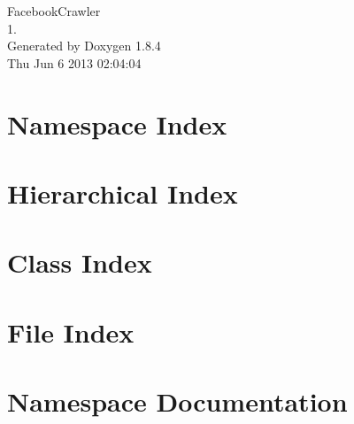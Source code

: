 \documentclass[twoside]{book}
\newcommand{\clearemptydoublepage}{%
  \newpage{\pagestyle{empty}\cleardoublepage}%
}
\begin{document}
\hypersetup{pageanchor=false}
\begin{titlepage}
\vspace*{7cm}
\begin{center}%
{\Large Facebook\-Crawler \\[1ex]\large 1. }\\
\vspace*{1cm}
{\large Generated by Doxygen 1.8.4}\\
\vspace*{0.5cm}
{\small Thu Jun 6 2013 02:04:04}\\
\end{center}
\end{titlepage}
\clearemptydoublepage
\tableofcontents
\clearemptydoublepage
{}
\hypersetup{pageanchor=true}

\chapter{Namespace Index}

\chapter{Hierarchical Index}

\chapter{Class Index}

\chapter{File Index}

\chapter{Namespace Documentation}




\end{document}
